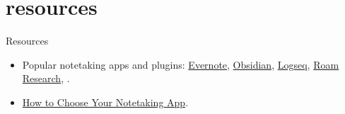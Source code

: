 \documentclass{article}
\begin{document}
\section{resources}{Resources}
\begin{itemize}
  \item 
    Popular notetaking apps and plugins: \href{https://evernote.com/}{Evernote}, \href{https://obsidian.md/}{Obsidian}, \href{https://logseq.com/}{Logseq}, \href{https://roamresearch.com/}{Roam Research}, \href{https://www.orgroam.com/}{}.
  \item 
    \href{https://www.buildingasecondbrain.com/resources}{How to Choose Your Notetaking App}.
\end{itemize}
\end{document}
